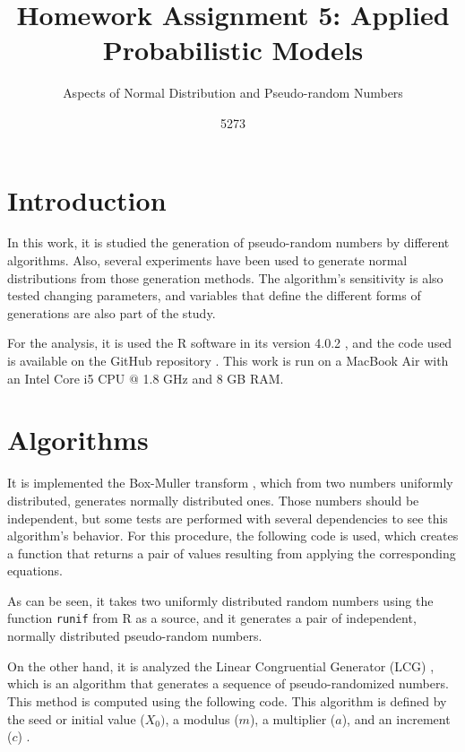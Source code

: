 \documentclass[10pt,leter,openany]{article}
\author{5273}
\title{Homework Assignment 5: Applied Probabilistic Models}
\subtitle{Aspects of Normal Distribution and Pseudo-random Numbers }
\date{}
\begin{document}
	
\maketitle

\section{Introduction}
	
	In this work, it is studied the generation of pseudo-random numbers by different algorithms. Also, several experiments have been used to generate normal distributions from those generation methods. The algorithm's sensitivity is also tested changing parameters, and variables that define the different forms of generations are also part of the study.
	
	For the analysis, it is used the R software in its version 4.0.2 \citep{r}, and the code used is available on the GitHub repository \citep{github}. This work is run on a MacBook Air with an Intel Core i5 CPU $ @ $ 1.8 GHz and 8 GB RAM.
	
\section{Algorithms}
	 
	It is implemented the Box-Muller transform \citep{box1958note}, which from two numbers uniformly distributed, generates normally distributed ones. Those numbers should be independent, but some tests are performed with several dependencies to see this algorithm's behavior. For this procedure, the following code is used, which creates a function that returns a pair of values resulting from applying the corresponding equations. 
	
	
	
	As can be seen, it takes two uniformly distributed random numbers using the function \texttt{runif} from R as a source, and it generates a pair of independent, normally distributed pseudo-random numbers.
	
	On the other hand, it is analyzed the Linear Congruential Generator (LCG) \citep{l2017history}, which is an algorithm that generates a sequence of pseudo-randomized numbers. This method is computed using the following code. This algorithm is defined by the seed or initial value ($X_{0}) $, a modulus ($m$), a multiplier ($a$), and an increment ($c$) . 
	
	
	
	
\end{document}
